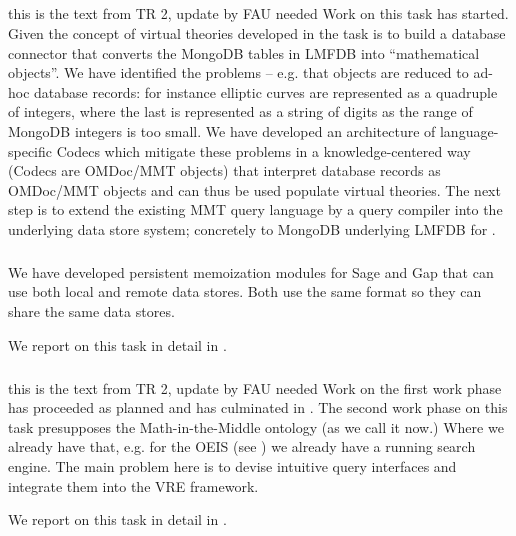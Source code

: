 \subparagraph{}
\label{dksbases@data-LMFDB}

\begin{oldpart}{this is the text from TR 2, update by FAU needed}
Work on this task has started. Given the concept of virtual theories developed in  the task is to build a database connector that converts the MongoDB tables in LMFDB into ``mathematical objects''.
We have identified the problems -- e.g. that objects are reduced to ad-hoc database records: for instance elliptic curves are represented as a quadruple of integers, where the last is represented as a string of digits as the range of MongoDB integers is too small.
We have developed an architecture of language-specific Codecs which mitigate these problems in a knowledge-centered way (Codecs are OMDoc/MMT objects) that interpret database records as OMDoc/MMT objects and can thus be used populate virtual theories.
The next step is to extend the existing MMT query language by a query compiler into the underlying data store system; concretely to MongoDB underlying LMFDB for .
\end{oldpart}
\medskip

\subparagraph{}
\label{dksbases@data-memo}
We have developed persistent memoization modules for Sage and Gap that can use both local and remote data stores.
Both use the same format so they can share the same data stores.

We report on this task in detail in .
\medskip

\subparagraph{}
\begin{oldpart}{this is the text from TR 2, update by FAU needed}
Work on the first work phase has proceeded as planned and has culminated in .
The second work phase on this task presupposes the Math-in-the-Middle ontology (as we call it now.)
Where we already have that, e.g. for the OEIS (see ) we already have a running search engine.
The main problem here is to devise intuitive query interfaces and integrate them into the \pn VRE framework.
\end{oldpart}

We report on this task in detail in .
\medskip

